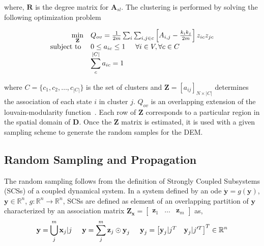 \noindent where, $\textbf{R}$ is the degree matrix for $\textbf{A}_{sl}$. The clustering is performed by solving the following optimization problem~\cite{xie2013overlapping}

\begin{equation}
\label{louvain}
\begin{array}{rl}
\displaystyle \min_{\textbf{Z}} & Q_{ov}  = \frac{1}{2m}\sum_i \sum_{i,j \in c} \left[ A_{i,j} - \frac{k_i k_j}{2m} \right] z_{ic} z_{jc} \\
\displaystyle \text{subject to } & 0 \leq a_{ic} \leq 1 \hspace{5mm} \forall i \in V, \forall c \in C \\
& \displaystyle \sum_c^{|C|} a_{ic} = 1
\end{array}
\end{equation}

\noindent where $C = \lbrace c_1, c_2, \ldots, c_{|C|} \rbrace$ is the set of clusters and $\textbf{Z} = [a_{ij}]_{N \times |C|}$ determines the association of each state $i$ in cluster $j$. $Q_{ov}$ is an overlapping extension of the louvain-modularity function~\cite{blondel2008fast}. Each row of $\textbf{Z}$ corresponds to a particular region in the spatial domain of $\textbf{D}$. Once the $\textbf{Z}$ matrix is estimated, it is used with a given sampling scheme to generate the random samples for the DEM. 


\subsection{Random Sampling and Propagation}

The random sampling follows from the definition of Strongly Coupled Subsystems (SCSs) of a coupled dynamical system. In a system defined by an ode $\dot{\textbf{y}} = g(\textbf{y})$, $\textbf{y} \in \mathbb{R}^n$, $g:\mathbb{R}^n \rightarrow \mathbb{R}^n$, SCSs are defined as element of an overlapping partition of $\textbf{y}$ characterized by an association matrix $\textbf{Z}_{\textbf{x}} = \begin{bmatrix}
\textbf{z}_1 & \ldots & \textbf{z}_m
\end{bmatrix}$ as,
\begin{equation}
\label{hadprod}
\textbf{y} = \bigcup_j^m \textbf{x}_j|j \hspace{5mm} \textbf{y} = \sum_j^m \textbf{z}_j \odot \textbf{y}_j \hspace{5mm} \textbf{y}_j = \begin{bmatrix} \textbf{y}_j|j^T & \textbf{y}_j|j'^T \end{bmatrix}^T \in \mathbb{R}^n
\end{equation}

